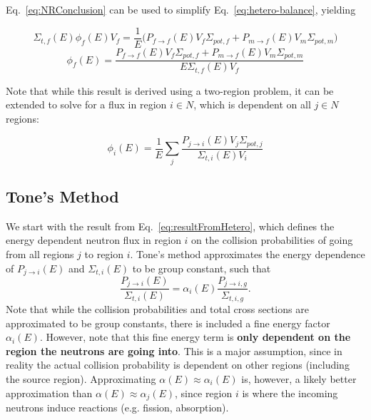 \documentclass[10pt]{article}
\begin{document}
Eq.~\ref{eq:NRConclusion} can be used to simplify Eq.~\ref{eq:hetero-balance}, yielding


\begin{equation}\Sigma_{t,f}(E)\phi_{f}(E)V_{f}=\frac{1}{E}\Big(P_{f\rightarrow f}(E)V_{f}\Sigma_{pot,f}+P_{m\rightarrow f}(E)V_{m}\Sigma_{pot,m}\Big)\end{equation}
\begin{equation}\phi_{f}(E)=\frac{P_{f\rightarrow f}(E)V_f\Sigma_{pot,f}+P_{m\rightarrow f}(E)V_m\Sigma_{pot,m}}{E\Sigma_{t,f}(E)V_f}\end{equation}

Note that while this result is derived using a two-region problem, it can be extended to solve for a flux in region $i\in N$, which is dependent on all $j\in N$ regions:

\begin{equation}\phi_{i}(E)=\frac{1}{E}\sum\limits_j\frac{P_{j\rightarrow i}(E)V_{j}\Sigma_{pot,j}}{\Sigma_{t,i}(E)V_{i}}\label{eq:resultFromHetero}\end{equation}




\subsection{Tone's Method}
We start with the result from Eq.~\ref{eq:resultFromHetero}, which defines the energy dependent neutron flux in region $i$ on the collision probabilities of going from all regions $j$ to region $i$. Tone's method approximates the energy dependence of $P_{j\rightarrow i}(E)$ and $\Sigma_{t,i}(E)$ to be group constant, such that 
\begin{equation}\frac{P_{j\rightarrow i}(E)}{\Sigma_{t,i}(E)}=\alpha_{i}(E)\frac{P_{j\rightarrow i,g}}{\Sigma_{t,i,g}}.\label{eq:tonesApprox}\end{equation}
  Note that while the collision probabilities and total cross sections are approximated to be group constants, there is included a fine energy factor $\alpha_i(E)$. However, note that this fine energy term is \textbf{only dependent on the region the neutrons are going into}. This is a major assumption, since in reality the actual collision probability is dependent on other regions (including the source region). Approximating $\alpha(E)\approx\alpha_i(E)$ is, however, a likely better approximation than $\alpha(E)\approx\alpha_j(E)$, since region $i$ is where the incoming neutrons induce reactions (e.g. fission, absorption).
\end{document}
